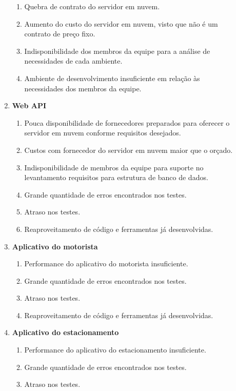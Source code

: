 \begin{description}
\begin{enumerate}[label=\arabic*.]
\begin{enumerate}[label*=\arabic*.]
			      \item Quebra de contrato do servidor em nuvem.
			      \item Aumento do custo do servidor em nuvem, visto que não é um contrato de preço fixo.
			      \item Indisponibilidade dos membros da equipe para a análise de necessidades de cada ambiente.
			      \item Ambiente de desenvolvimento insuficiente em relação às necessidades dos membros da equipe.
		      \end{enumerate}
		\item \textbf{Web API}
		      \begin{enumerate}[label*=\arabic*.]
			      \item Pouca disponibilidade de fornecedores preparados para oferecer o servidor em nuvem conforme requisitos desejados.
			      \item Custos com fornecedor do servidor em nuvem maior que o orçado.
			      \item Indisponibilidade de membros da equipe para suporte no levantamento requisitos para estrutura de banco de dados.
			      \item Grande quantidade de erros encontrados nos testes.
			      \item Atraso nos testes.
			      \item Reaproveitamento de código e ferramentas já desenvolvidas.
		      \end{enumerate}
		\item \textbf{Aplicativo do motorista}
		      \begin{enumerate}[label*=\arabic*.]
			      \item Performance do aplicativo do motorista insuficiente.
			      \item Grande quantidade de erros encontrados nos testes.
			      \item Atraso nos testes.
			      \item Reaproveitamento de código e ferramentas já desenvolvidas.
		      \end{enumerate}
		\item \textbf{Aplicativo do estacionamento}
		      \begin{enumerate}[label*=\arabic*.]
			      \item Performance do aplicativo do estacionamento insuficiente.
			      \item Grande quantidade de erros encontrados nos testes.
			      \item Atraso nos testes.

\end{enumerate}
\end{enumerate}
\end{description}
